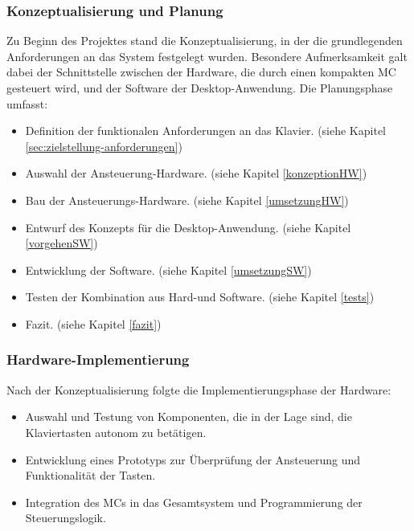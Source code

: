 \subsubsection{Konzeptualisierung und Planung}\label{Vorgehensweise - Konzeptualisierung und Planung}

Zu Beginn des Projektes stand die Konzeptualisierung, in der die grundlegenden Anforderungen an das System festgelegt wurden.
Besondere Aufmerksamkeit galt dabei der Schnittstelle zwischen der Hardware, die durch einen kompakten \ac{MC} gesteuert wird, und der Software der Desktop-Anwendung.
Die Planungsphase umfasst: %

\begin{itemize}
    \item Definition der funktionalen Anforderungen an das Klavier. (siehe Kapitel \ref{sec:zielstellung-anforderungen})
    \item Auswahl der Ansteuerung-Hardware. (siehe Kapitel \ref{konzeptionHW})
    \item Bau der Ansteuerungs-Hardware. (siehe Kapitel \ref{umsetzungHW})
    \item Entwurf des Konzepts für die Desktop-Anwendung. (siehe Kapitel \ref{vorgehenSW})
    \item Entwicklung der Software. (siehe Kapitel \ref{umsetzungSW})
    \item Testen der Kombination aus Hard-und Software. (siehe Kapitel \ref{tests})
    \item Fazit. (siehe Kapitel \ref{fazit})
\end{itemize}

\subsubsection{Hardware-Implementierung}\label{Vorgehensweise - Hardware-Implementierung}

Nach der Konzeptualisierung folgte die Implementierungsphase der Hardware:

\begin{itemize}
    \item Auswahl und Testung von Komponenten, die in der Lage sind, die Klaviertasten autonom zu betätigen.
    \item Entwicklung eines Prototyps zur Überprüfung der Ansteuerung und Funktionalität der Tasten.
    \item Integration des \ac{MC}s in das Gesamtsystem und Programmierung der Steuerungslogik. %
\end{itemize}

